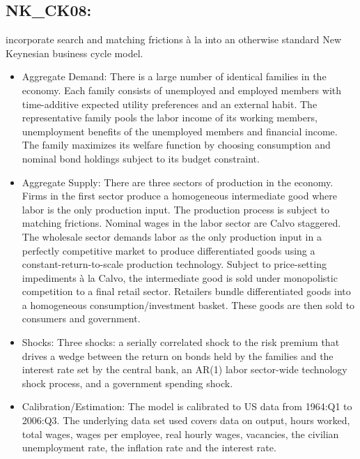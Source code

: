 \documentclass[11pt,a4paper]{article}
\begin{document}
	\subsection{NK\_CK08: \texorpdfstring{\cite{ChristoffelKuester2008}}{Christoffel and Kuester (2008)}}
	\label{NKCK08}
	\cite{ChristoffelKuester2008} incorporate search and matching frictions \`{a} la \cite{MortensenPissarides1994} into an otherwise standard New Keynesian business cycle model.
	
	\begin{itemize}
		
		\item Aggregate Demand: There is a large number of identical families in the economy. Each family consists of unemployed and employed members with time-additive expected utility preferences and an external habit. The representative family pools the labor income of its working members, unemployment benefits of the unemployed members and financial income. The family maximizes its welfare function by choosing consumption and nominal bond holdings subject to its budget constraint.
		
		\item Aggregate Supply: There are three sectors of production in the economy. Firms in the first sector produce a homogeneous intermediate good where labor is the only production input. The production process is subject to matching frictions. Nominal wages in the labor sector are Calvo staggered. The wholesale sector demands labor as the only production input in a perfectly competitive market to produce differentiated goods using a constant-return-to-scale production technology. Subject to price-setting impediments \`{a} la Calvo, the intermediate good is sold under monopolistic competition to a final retail sector. Retailers bundle differentiated goods into a homogeneous consumption/investment basket. These goods are then sold to consumers and government.
		
		\item Shocks: Three shocks: a serially correlated shock to the risk premium that drives a wedge between the return on bonds held by the families and the interest rate set by the central bank, an AR(1) labor sector-wide technology shock process, and a government spending shock.
		
		\item Calibration/Estimation: The model is calibrated to US data from 1964:Q1 to 2006:Q3. The underlying data set used covers data on output, hours worked, total wages, wages per employee, real hourly wages, vacancies, the civilian unemployment rate, the inflation rate and the interest rate.
		
		
	\end{itemize}
	
\end{document}
